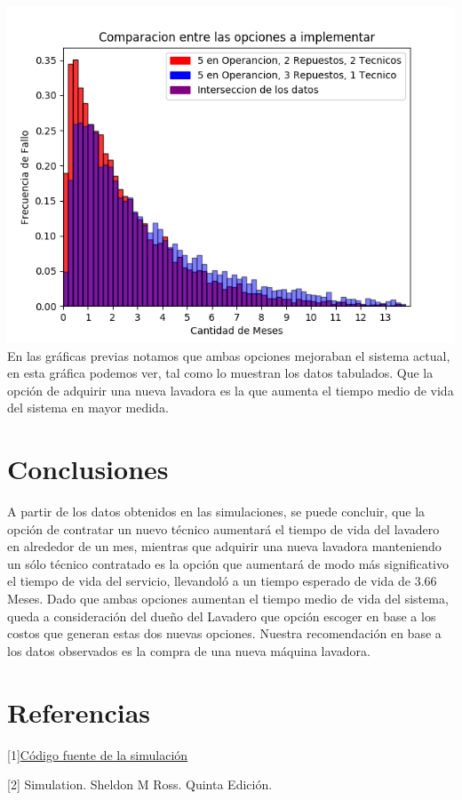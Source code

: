 \documentclass[11pt, spanish, a4paper]{article}
\begin{document}
\includegraphics{Figure_3}
En las gr\'aficas previas notamos que ambas opciones mejoraban el sistema actual, en esta gr\'afica podemos ver, tal como lo muestran los datos tabulados. Que la opci\'on de adquirir una nueva lavadora es la que aumenta el tiempo medio de vida del sistema en mayor medida.

\section{Conclusiones}
A partir de los datos obtenidos en las simulaciones, se puede concluir, que la opci\'on de contratar un nuevo t\'ecnico aumentar\'a el tiempo de vida del lavadero en alrededor de un mes, mientras que adquirir una nueva lavadora manteniendo un s\'olo t\'ecnico contratado es la opci\'on que aumentar\'a de modo m\'as significativo el tiempo de vida del servicio, llevandol\'o a un tiempo esperado de vida de 3.66 Meses. Dado que ambas opciones aumentan el tiempo medio de vida del sistema, queda a consideraci\'on del dueño del Lavadero que opci\'on escoger en base a los costos que generan estas dos nuevas opciones. Nuestra recomendaci\'on en base a los datos observados es la compra de una nueva m\'aquina lavadora.

\section{Referencias}

\label{repositorio}
[1]\href{https://github.com/mrcmoresi/MyS17/}{C\'odigo fuente de la simulaci\'on}

\label{libro}
[2] Simulation. Sheldon M Ross. Quinta Edici\'on.
\end{document}
